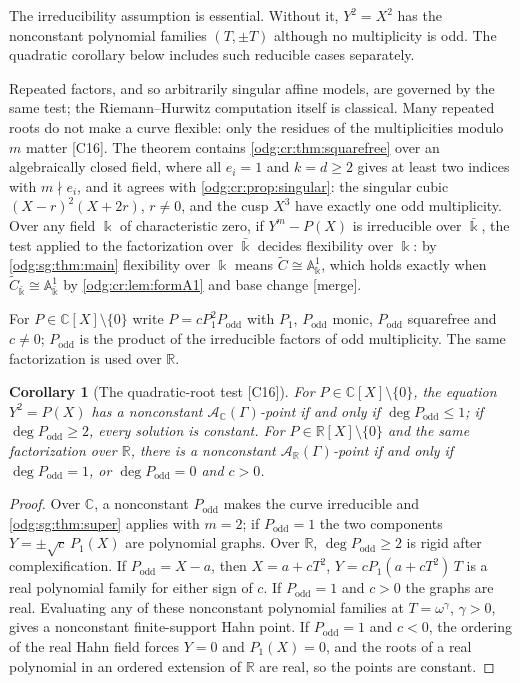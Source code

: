 \documentclass[11pt,oneside]{article}
\numberwithin{equation}{section}
\newtheorem{corollary}[corollary]{Corollary}
\theoremstyle{definition}
\theoremstyle{remark}
\newcommand{\R}{\mathbb R}
\newcommand{\C}{\mathbb C}
\newcommand{\src}[1]{\textup{\textsf{\small[#1]}}}
\newcommand{\mergetag}{\textup{\textsf{\small[merge]}}}
\newcommand{\Aff}{\mathbb A}
\begin{document}
The irreducibility assumption is essential. Without it, $Y^2=X^2$ has the
nonconstant polynomial families $(T,\pm T)$ although no multiplicity is odd.
The quadratic corollary below includes such reducible cases separately.

Repeated factors, and so arbitrarily singular affine models, are governed by the same test;
the Riemann--Hurwitz computation itself is classical. Many repeated roots do not make a
curve flexible: only the residues of the multiplicities modulo $m$ matter \src{C16}. The
theorem contains \cref{odg:cr:thm:squarefree} over an algebraically closed field, where
all $e_i=1$ and $k=d\ge2$ gives at least two indices with $m\nmid e_i$, and it agrees with
\cref{odg:cr:prop:singular}: the singular cubic $(X-r)^2(X+2r)$, $r\ne0$, and the cusp $X^3$
have exactly one odd multiplicity. Over any field $\Bbbk$ of characteristic zero, if
$Y^m-P(X)$ is irreducible over $\bar\Bbbk$, the test applied to the factorization over
$\bar\Bbbk$ decides flexibility over $\Bbbk$: by \cref{odg:sg:thm:main} flexibility over
$\Bbbk$ means $\widetilde C\cong\Aff^1_\Bbbk$, which holds exactly when
$\widetilde C_{\bar\Bbbk}\cong\Aff^1_{\bar\Bbbk}$ by \cref{odg:cr:lem:formA1} and base
change \mergetag.

For $P\in\C[X]\setminus\{0\}$ write $P=cP_1^2P_{\mathrm{odd}}$ with $P_1$, $P_{\mathrm{odd}}$
monic, $P_{\mathrm{odd}}$ squarefree and $c\ne0$; $P_{\mathrm{odd}}$ is the product of the
irreducible factors of odd multiplicity. The same factorization is used over $\R$.

\begin{corollary}[The quadratic-root test \src{C16}]\label{odg:sg:cor:hyper}
For $P\in\C[X]\setminus\{0\}$, the equation $Y^2=P(X)$ has a nonconstant
$\mathcal A_\C(\Gamma)$-point if and only if $\deg P_{\mathrm{odd}}\le1$; if
$\deg P_{\mathrm{odd}}\ge2$, every solution is constant. For $P\in\R[X]\setminus\{0\}$ and the
same factorization over $\R$, there is a nonconstant $\mathcal A_\R(\Gamma)$-point if and only
if $\deg P_{\mathrm{odd}}=1$, or $\deg P_{\mathrm{odd}}=0$ and $c>0$.
\end{corollary}
\begin{proof}
Over $\C$, a nonconstant $P_{\mathrm{odd}}$ makes the curve irreducible and
\cref{odg:sg:thm:super} applies with $m=2$; if $P_{\mathrm{odd}}=1$ the two components
$Y=\pm\sqrt c\,P_1(X)$ are polynomial graphs. Over $\R$, $\deg P_{\mathrm{odd}}\ge2$ is rigid
after complexification. If $P_{\mathrm{odd}}=X-a$, then $X=a+cT^2$, $Y=cP_1(a+cT^2)\,T$ is a
real polynomial family for either sign of $c$. If $P_{\mathrm{odd}}=1$ and $c>0$ the graphs
are real. Evaluating any of these nonconstant polynomial families at
$T=\omega^\gamma$, $\gamma>0$, gives a nonconstant finite-support Hahn point.
If $P_{\mathrm{odd}}=1$ and $c<0$, the ordering of the real Hahn field forces
$Y=0$ and $P_1(X)=0$, and the roots of a real polynomial in an ordered extension of $\R$
are real, so the points are constant.
\end{proof}
\end{document}
